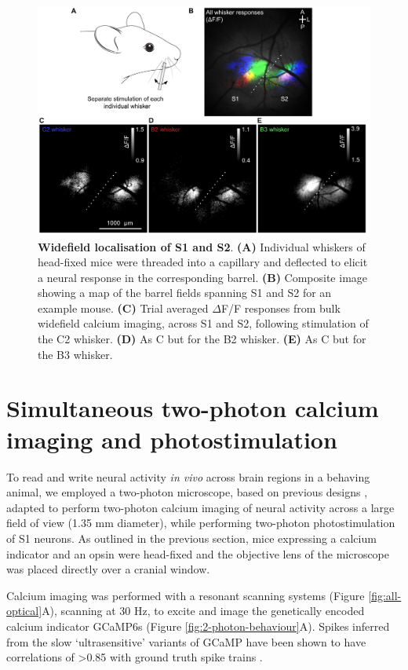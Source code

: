 \begin{figure}[h]
\includegraphics[scale=0.62]{figures/widefield-localisation.pdf}
\caption[\textbf{Widefield localisation of S1 and S2}]{
\textbf{Widefield localisation of S1 and S2}. \textbf{(A)} Individual whiskers of head-fixed mice were threaded into a capillary and deflected to elicit a neural response in the corresponding barrel. \textbf{(B)} Composite image showing a map of the barrel fields spanning S1 and S2 for an example mouse. \textbf{(C)} Trial averaged $\Delta$F/F responses from bulk widefield calcium imaging, across S1 and S2, following stimulation of the C2 whisker. \textbf{(D)} As C but for the B2 whisker. \textbf{(E)} As C but for the B3 whisker.
} 
\label{fig:widefield}
\end{figure}

\section{Simultaneous two-photon calcium imaging and photostimulation}

To read and write neural activity \textit{in vivo} across brain regions in a behaving animal, we employed a two-photon microscope, based on previous designs \cite{packer_simultaneous_2015}, adapted to perform two-photon calcium imaging of neural activity across a large field of view (1.35 mm diameter), while performing two-photon photostimulation of S1 neurons. As outlined in the previous section, mice expressing a calcium indicator and an opsin were head-fixed and the objective lens of the microscope was placed directly over a cranial window. 

Calcium imaging was performed with a resonant scanning systems (Figure \ref{fig:all-optical}A), scanning at 30 Hz, to excite and image the genetically encoded calcium indicator GCaMP6s \cite{chen_behaviour-dependent_2013} (Figure \ref{fig:2-photon-behaviour}A). Spikes inferred from the slow ‘ultrasensitive’ variants of GCaMP have been shown to have correlations of >0.85 with ground truth spike trains \cite{friedrich_fast_2017}.

